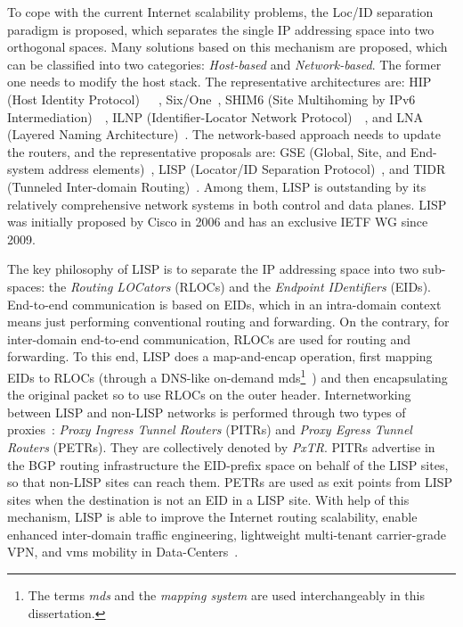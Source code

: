 To cope with the current Internet scalability problems, the Loc/ID separation paradigm is proposed, which separates the single IP addressing space into two orthogonal spaces. Many solutions based on this mechanism are proposed, which can be classified into two categories: \emph{Host-based} and \emph{Network-based}. The former one needs to modify the host stack. The representative architectures are: HIP (Host Identity Protocol)~\cite{nikander2010host}~\cite{Moskowitz2017host}~\cite{moskowitz2015host}, Six/One~\cite{vogt2007six}, SHIM6 (Site Multihoming by IPv6 Intermediation)~\cite{garcia2010shim6}~\cite{nordmark2009shim6}, ILNP (Identifier-Locator Network Protocol)~\cite{bhatti2012identifier}~\cite{atkinson2010evolving}, and LNA (Layered Naming Architecture)~\cite{balakrishnan2004layered}. The network-based approach needs to update the routers, and the representative proposals are: GSE (Global, Site, and End-system address elements)~\cite{o2006gse}, LISP (Locator/ID Separation Protocol)~\cite{rfc6830}, and TIDR (Tunneled Inter-domain Routing)~\cite{adan2006tunneled}. Among them, LISP is outstanding by its relatively comprehensive network systems in both control and data planes. %
LISP was initially proposed by Cisco in 2006 and has an exclusive IETF WG since 2009. %

The key philosophy of LISP is to separate the IP addressing space into two sub-spaces: the \emph{Routing LOCators} (RLOCs) and the \emph{Endpoint IDentifiers} (EIDs). End-to-end communication is based on EIDs, which in an intra-domain context means just performing conventional routing and forwarding. On the contrary, for inter-domain end-to-end communication, RLOCs are used for routing and forwarding. To this end, LISP does a map-and-encap operation, first mapping EIDs to RLOCs (through a DNS-like on-demand \acrfull{mds}\footnote{The terms \emph{\acrfull{mds}} and the \emph{mapping system} are used interchangeably in this dissertation.}~\cite{lispALTPourri}) and then encapsulating the original packet so to use RLOCs on the outer header. Internetworking between LISP and non-LISP networks is performed through two types of proxies~\cite{rfc6832}: \emph{Proxy Ingress Tunnel Routers} (PITRs) and \emph{Proxy Egress Tunnel Routers} (PETRs). They are collectively denoted by \emph{PxTR}. PITRs advertise in the BGP  routing infrastructure the EID-prefix space on behalf of the LISP sites, so that non-LISP sites can reach them. %
PETRs are used as exit points from LISP sites when the destination is not an EID in a LISP site. %
With help of this mechanism, LISP is able to improve the Internet routing scalability, enable enhanced inter-domain traffic engineering, lightweight multi-tenant carrier-grade VPN, and \acrshort{vm}s mobility in Data-Centers~\cite{saucez2012designing}.

